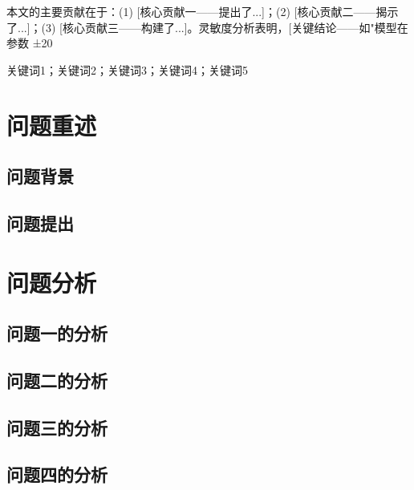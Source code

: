 \documentclass[12pt,a4paper]{ctexart}
\begin{document}
本文的主要贡献在于：(1) [核心贡献一——提出了...]；(2) [核心贡献二——揭示了...]；(3) [核心贡献三——构建了...]。灵敏度分析表明，[关键结论——如"模型在参数 ±20%

\vspace{0.5em}
关键词1；关键词2；关键词3；关键词4；关键词5
\label{abstractend}  %

\newpage


\section{问题重述}
\subsection{问题背景}  %
\subsection{问题提出}  %

\section{问题分析}
\subsection{问题一的分析}  %
\subsection{问题二的分析}
\subsection{问题三的分析}
\subsection{问题四的分析}
\end{document}
